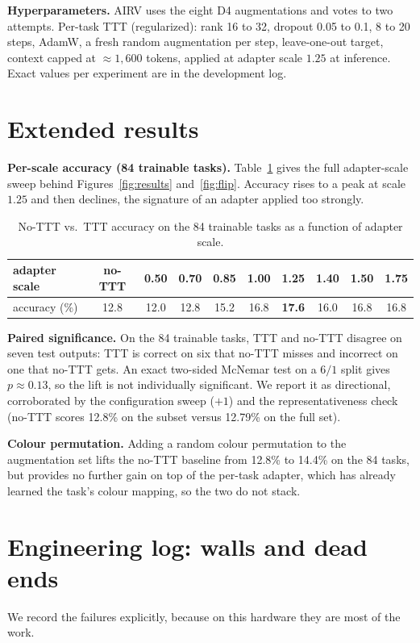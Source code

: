 \documentclass[11pt]{article}
\begin{document}
\textbf{Hyperparameters.} AIRV uses the eight D4 augmentations and votes to two attempts. Per-task
TTT (regularized): rank 16 to 32, dropout 0.05 to 0.1, 8 to 20 steps, AdamW, a fresh random
augmentation per step, leave-one-out target, context capped at $\approx 1{,}600$ tokens, applied at
adapter scale $1.25$ at inference. Exact values per experiment are in the development log.

\section{Extended results}
\label{app:results}

\textbf{Per-scale accuracy (84 trainable tasks).} Table~\ref{tab:perscale} gives the full
adapter-scale sweep behind Figures~\ref{fig:results} and~\ref{fig:flip}. Accuracy rises to a peak at
scale~$1.25$ and then declines, the signature of an adapter applied too strongly.

\begin{table}[H]
\centering
\caption{No-TTT vs.\ TTT accuracy on the 84 trainable tasks as a function of adapter scale.}
\label{tab:perscale}
\begin{tabular}{lccccccccc}
\toprule
adapter scale & no-TTT & 0.50 & 0.70 & 0.85 & 1.00 & \textbf{1.25} & 1.40 & 1.50 & 1.75 \\
\midrule
accuracy (\%) & 12.8 & 12.0 & 12.8 & 15.2 & 16.8 & \textbf{17.6} & 16.0 & 16.8 & 16.8 \\
\bottomrule
\end{tabular}
\end{table}

\textbf{Paired significance.} On the 84 trainable tasks, TTT and no-TTT disagree on seven test
outputs: TTT is correct on six that no-TTT misses and incorrect on one that no-TTT gets. An exact
two-sided McNemar test on a $6/1$ split gives $p\approx0.13$, so the lift is not individually
significant. We report it as directional, corroborated by the configuration sweep ($+1$) and the
representativeness check (no-TTT scores 12.8\% on the subset versus 12.79\% on the full set).

\textbf{Colour permutation.} Adding a random colour permutation to the augmentation set lifts the
no-TTT baseline from 12.8\% to 14.4\% on the 84 tasks, but provides no further gain on top of the
per-task adapter, which has already learned the task's colour mapping, so the two do not stack.

\section{Engineering log: walls and dead ends}
\label{app:log}
We record the failures explicitly, because on this hardware they are most of the work.
\end{document}
